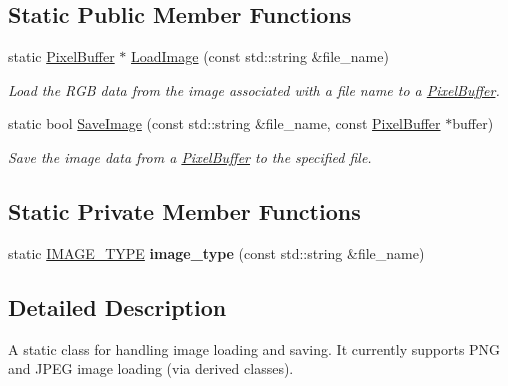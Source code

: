 \subsection*{Static Public Member Functions}
\begin{DoxyCompactItemize}
\item 
static \hyperlink{classimage__tools_1_1PixelBuffer}{Pixel\+Buffer} $\ast$ \hyperlink{classimage__tools_1_1ImageHandler_aad1dfd6cf01b3b99f14d5be0f5adad7b}{Load\+Image} (const std\+::string \&file\+\_\+name)
\begin{DoxyCompactList}\small\item\em Load the R\+GB data from the image associated with a file name to a \hyperlink{classimage__tools_1_1PixelBuffer}{Pixel\+Buffer}. \end{DoxyCompactList}\item 
static bool \hyperlink{classimage__tools_1_1ImageHandler_a699e712126c1cd81be7829d277a12fc7}{Save\+Image} (const std\+::string \&file\+\_\+name, const \hyperlink{classimage__tools_1_1PixelBuffer}{Pixel\+Buffer} $\ast$buffer)
\begin{DoxyCompactList}\small\item\em Save the image data from a \hyperlink{classimage__tools_1_1PixelBuffer}{Pixel\+Buffer} to the specified file. \end{DoxyCompactList}\end{DoxyCompactItemize}
\subsection*{Static Private Member Functions}
\begin{DoxyCompactItemize}
\item 
static \hyperlink{classimage__tools_1_1ImageHandler_a1ad849e8783b00364ed9353861540868}{I\+M\+A\+G\+E\+\_\+\+T\+Y\+PE} {\bfseries image\+\_\+type} (const std\+::string \&file\+\_\+name)\hypertarget{classimage__tools_1_1ImageHandler_a581d3d4835efd20091225b67395c105e}{}\label{classimage__tools_1_1ImageHandler_a581d3d4835efd20091225b67395c105e}

\end{DoxyCompactItemize}


\subsection{Detailed Description}
A static class for handling image loading and saving. It currently supports P\+NG and J\+P\+EG image loading (via derived classes). 

